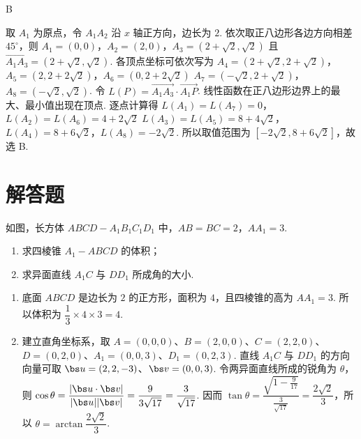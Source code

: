\begin{answer}
B
\end{answer}

\begin{solution}
取 \(A_1\) 为原点，令 \(A_1A_2\) 沿 \(x\) 轴正方向，边长为 \(2\). 依次取正八边形各边方向相差 \(45^\circ\)，则
\(A_1=(0,0)\)，\(A_2=(2,0)\)，\(A_3=(2+\sqrt2,\sqrt2)\)
且 \(\overrightarrow{A_1A_3}=(2+\sqrt2,\sqrt2)\). 各顶点坐标可依次写为
\(A_4=(2+\sqrt2,2+\sqrt2)\)，\(A_5=(2,2+2\sqrt2)\)，\(A_6=(0,2+2\sqrt2)\)
\(A_7=(-\sqrt2,2+\sqrt2)\)，\(A_8=(-\sqrt2,\sqrt2)\).
令 \(L(P)=\overrightarrow{A_1A_3}\cdot\overrightarrow{A_1P}\). 线性函数在正八边形边界上的最大、最小值出现在顶点. 逐点计算得
\(L(A_1)=L(A_7)=0\)，\(L(A_2)=L(A_6)=4+2\sqrt2\)
\(L(A_3)=L(A_5)=8+4\sqrt2\)，\(L(A_4)=8+6\sqrt2\)，\(L(A_8)=-2\sqrt2\).
所以取值范围为 \([-2\sqrt2,8+6\sqrt2]\)，故选 B.
\end{solution}

\section{解答题}

\begin{problem}
如图，长方体 \(ABCD-A_1B_1C_1D_1\) 中，\(AB=BC=2\)，\(AA_1=3\).

\begin{enumerate}
\item 求四棱锥 \(A_1-ABCD\) 的体积；
\item 求异面直线 \(A_1C\) 与 \(DD_1\) 所成角的大小.
\end{enumerate}

\end{problem}

\begin{solution}
\begin{enumerate}
\item 底面 \(ABCD\) 是边长为 \(2\) 的正方形，面积为 \(4\)，且四棱锥的高为 \(AA_1=3\). 所以体积为 \(\dfrac13\times4\times3=4\).
\item 建立直角坐标系，取 \(A=(0,0,0)\)、\(B=(2,0,0)\)、\(C=(2,2,0)\)、\(D=(0,2,0)\)、\(A_1=(0,0,3)\)、\(D_1=(0,2,3)\). 直线 \(A_1C\) 与 \(DD_1\) 的方向向量可取 \(\bs u=(2,2,-3)\)、\(\bs v=(0,0,3)\). 令两异面直线所成的锐角为 \(\theta\)，则 \(\cos\theta=\dfrac{|\bs u\cdot\bs v|}{|\bs u||\bs v|}=\dfrac9{3\sqrt{17}}=\dfrac3{\sqrt{17}}\). 因而 \(\tan\theta=\dfrac{\sqrt{1-\frac{9}{17}}}{\frac{3}{\sqrt{17}}}=\dfrac{2\sqrt2}{3}\)，所以 \(\theta=\arctan\dfrac{2\sqrt2}{3}\).
\end{enumerate}
\end{solution}

